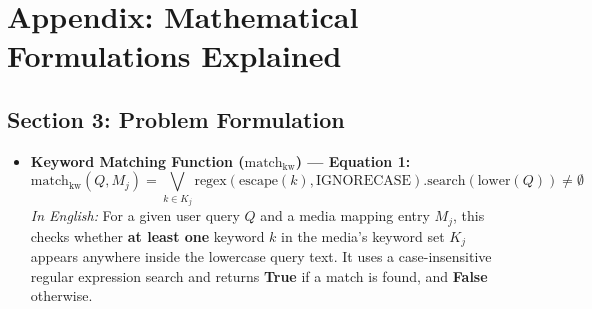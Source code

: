 \documentclass{article}
\begin{document}
\appendix
\section{Appendix: Mathematical Formulations Explained}

\subsection{Section 3: Problem Formulation}
\begin{itemize}
    \item \textbf{Keyword Matching Function ($\text{match}_{\text{kw}}$) --- Equation 1:}
    $$\text{match}_{\text{kw}}(Q, M_j) = \bigvee_{k \in K_j} \text{regex}(\text{escape}(k), \text{IGNORECASE}).\text{search}(\text{lower}(Q)) \neq \emptyset$$
    \textit{In English:} For a given user query $Q$ and a media mapping entry $M_j$, this checks whether \textbf{at least one} keyword $k$ in the media's keyword set $K_j$ appears anywhere inside the lowercase query text. It uses a case-insensitive regular expression search and returns \textbf{True} if a match is found, and \textbf{False} otherwise.
\end{itemize}
\end{document}
